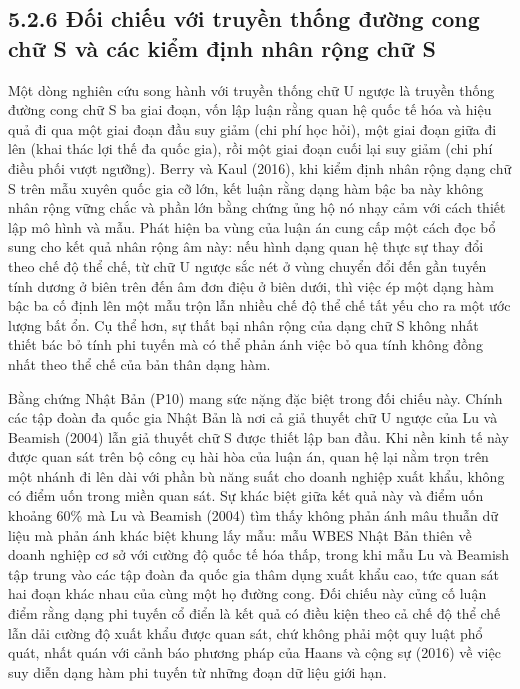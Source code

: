 \documentclass[
  a4paper,
  13pt]{extreport}
\begin{document}
\hypertarget{ux111ux1ed1i-chiux1ebfu-vux1edbi-truyux1ec1n-thux1ed1ng-ux111ux1b0ux1eddng-cong-chux1eef-s-vuxe0-cuxe1c-kiux1ec3m-ux111ux1ecbnh-nhuxe2n-rux1ed9ng-chux1eef-s}{%
\subsection{5.2.6 Đối chiếu với truyền thống đường cong chữ S và các
kiểm định nhân rộng chữ
S}\label{ux111ux1ed1i-chiux1ebfu-vux1edbi-truyux1ec1n-thux1ed1ng-ux111ux1b0ux1eddng-cong-chux1eef-s-vuxe0-cuxe1c-kiux1ec3m-ux111ux1ecbnh-nhuxe2n-rux1ed9ng-chux1eef-s}}

Một dòng nghiên cứu song hành với truyền thống chữ U ngược là truyền
thống đường cong chữ S ba giai đoạn, vốn lập luận rằng quan hệ quốc tế
hóa và hiệu quả đi qua một giai đoạn đầu suy giảm (chi phí học hỏi), một
giai đoạn giữa đi lên (khai thác lợi thế đa quốc gia), rồi một giai đoạn
cuối lại suy giảm (chi phí điều phối vượt ngưỡng). Berry và Kaul (2016),
khi kiểm định nhân rộng dạng chữ S trên mẫu xuyên quốc gia cỡ lớn, kết
luận rằng dạng hàm bậc ba này không nhân rộng vững chắc và phần lớn bằng
chứng ủng hộ nó nhạy cảm với cách thiết lập mô hình và mẫu. Phát hiện ba
vùng của luận án cung cấp một cách đọc bổ sung cho kết quả nhân rộng âm
này: nếu hình dạng quan hệ thực sự thay đổi theo chế độ thể chế, từ chữ
U ngược sắc nét ở vùng chuyển đổi đến gần tuyến tính dương ở biên trên
đến âm đơn điệu ở biên dưới, thì việc ép một dạng hàm bậc ba cố định lên
một mẫu trộn lẫn nhiều chế độ thể chế tất yếu cho ra một ước lượng bất
ổn. Cụ thể hơn, sự thất bại nhân rộng của dạng chữ S không nhất thiết
bác bỏ tính phi tuyến mà có thể phản ánh việc bỏ qua tính không đồng
nhất theo thể chế của bản thân dạng hàm.

Bằng chứng Nhật Bản (P10) mang sức nặng đặc biệt trong đối chiếu này.
Chính các tập đoàn đa quốc gia Nhật Bản là nơi cả giả thuyết chữ U ngược
của Lu và Beamish (2004) lẫn giả thuyết chữ S được thiết lập ban đầu.
Khi nền kinh tế này được quan sát trên bộ công cụ hài hòa của luận án,
quan hệ lại nằm trọn trên một nhánh đi lên dài với phần bù năng suất cho
doanh nghiệp xuất khẩu, không có điểm uốn trong miền quan sát. Sự khác
biệt giữa kết quả này và điểm uốn khoảng 60\% mà Lu và Beamish (2004)
tìm thấy không phản ánh mâu thuẫn dữ liệu mà phản ánh khác biệt khung
lấy mẫu: mẫu WBES Nhật Bản thiên về doanh nghiệp cơ sở với cường độ quốc
tế hóa thấp, trong khi mẫu Lu và Beamish tập trung vào các tập đoàn đa
quốc gia thâm dụng xuất khẩu cao, tức quan sát hai đoạn khác nhau của
cùng một họ đường cong. Đối chiếu này củng cố luận điểm rằng dạng phi
tuyến cổ điển là kết quả có điều kiện theo cả chế độ thể chế lẫn dải
cường độ xuất khẩu được quan sát, chứ không phải một quy luật phổ quát,
nhất quán với cảnh báo phương pháp của Haans và cộng sự (2016) về việc
suy diễn dạng hàm phi tuyến từ những đoạn dữ liệu giới hạn.
\end{document}
